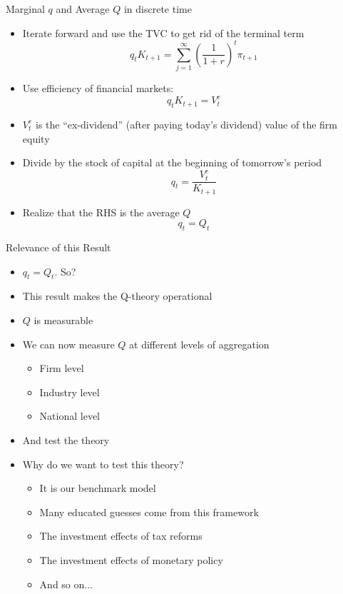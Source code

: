 \documentclass[11pt,aspectratio=169,xcolor={dvipsnames},hyperref={pdftex,pdfpagemode=UseNone,hidelinks,pdfdisplaydoctitle=true},usepdftitle=false]{beamer}
\begin{document}
\begin{frame}{Marginal $q$ and Average $Q$ in discrete time}
\begin{itemize}
\item Iterate forward and use the TVC to get rid of the terminal term
$$q_t K_{t+1} =  \sum_{j=1}^{\infty} \left(\frac{1}{1+r}\right)^t \pi_{t+1}$$
\vspace{-0.5cm}
\item Use efficiency of financial markets:
$$q_t K_{t+1} = V^e_{t}$$
\pause
\item $V_t^e$ is the ``ex-dividend'' (after paying today's dividend) value of the firm equity
\item Divide by the stock of capital at the beginning of tomorrow's period
$$q_t =\frac{ V^e_{t}}{K_{t+1}}$$
\vspace{-0.5cm}
\pause
\item Realize that the RHS is the average $Q$
$$q_t = Q_t$$
\end{itemize}
\end{frame}

\begin{frame}{Relevance of this Result}
\begin{itemize}
\item $q_t = Q_t$. So?
\pause
\item This result makes the Q-theory operational
\pause
\item $Q$ is measurable
\pause
\item We can now measure $Q$ at different levels of aggregation
\begin{itemize}
\item Firm level
\item Industry level
\item National level
\end{itemize}
\item  And test the theory
\pause
\item Why do we want to test this theory?
\begin{itemize}
\item It is our benchmark model
\item Many educated guesses come from this framework
\item The investment effects of tax reforms
\item The investment effects of monetary policy
\item And so on...
\end{itemize}
\end{itemize}
\end{frame}
\end{document}
